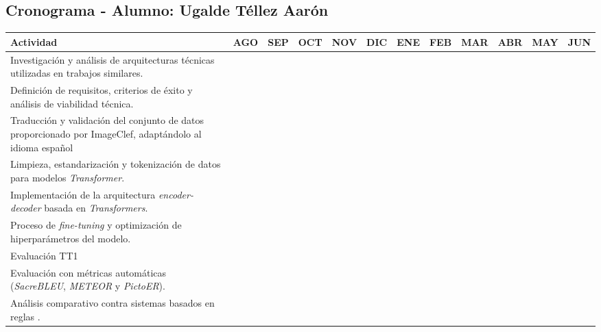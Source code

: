 \documentclass[10pt,letterpaper]{article}
\begin{document}
\subsection{Cronograma - Alumno: Ugalde Téllez Aarón}
\begin{table}[H]
\centering\footnotesize
\begin{tabular}{|p{5.5cm}|c|c|c|c|c|c|c|c|c|c|c|}
\hline
\textbf{Actividad} & \textbf{AGO} & \textbf{SEP} & \textbf{OCT} & \textbf{NOV} & \textbf{DIC} & \textbf{ENE} & \textbf{FEB} & \textbf{MAR} & \textbf{ABR} & \textbf{MAY} & \textbf{JUN} \\ \hline

Investigación y análisis de arquitecturas técnicas utilizadas en trabajos similares. & \cellcolor{gris30} & \cellcolor{gris30} & & & & & & & & & \\ \hline

Definición de requisitos, criterios de éxito y análisis de viabilidad técnica. & \cellcolor{gris30} & \cellcolor{gris30} & & & & & & & & & \\ \hline

Traducción y validación del conjunto de datos proporcionado por ImageClef, adaptándolo al idioma español & & \cellcolor{gris30} & \cellcolor{gris30} & \cellcolor{gris30} & & & & & & & \\ \hline

Limpieza, estandarización y tokenización de datos para modelos \textit{Transformer}. & & & \cellcolor{gris30} & \cellcolor{gris30} & & & & & & & \\ \hline

Implementación de la arquitectura \textit{encoder-decoder} basada en \textit{Transformers}. & & & \cellcolor{gris30} & \cellcolor{gris30} & & & & & & & \\ \hline

Proceso de \textit{fine-tuning} y optimización de hiperparámetros del modelo. & & & & \cellcolor{gris30} & \cellcolor{gris30} & \cellcolor{gris30} & & & & & \\ \hline

Evaluación TT1 & & & & \cellcolor{gris30} & \cellcolor{gris30} & & & & & & \\ \hline

Evaluación con métricas automáticas (\textit{SacreBLEU}, \textit{METEOR} y \textit{PictoER}). & & & & & & & \cellcolor{gris30} & \cellcolor{gris30} & & & \\ \hline

Análisis comparativo contra sistemas basados en reglas . & & & & & & & & \cellcolor{gris30} & \cellcolor{gris30} & & \\ \hline


\end{tabular}
\end{table}
\end{document}
